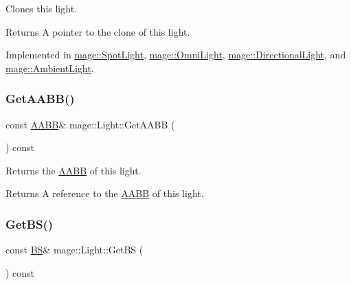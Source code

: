 Clones this light.

\begin{DoxyReturn}{Returns}
A pointer to the clone of this light. 
\end{DoxyReturn}


Implemented in \hyperlink{classmage_1_1_spot_light_a060044ae1de97143878ad26524f03709}{mage\+::\+Spot\+Light}, \hyperlink{classmage_1_1_omni_light_a1212457828cdd96cc7170767b7bd1223}{mage\+::\+Omni\+Light}, \hyperlink{classmage_1_1_directional_light_a122d3dcd7633a85ef8a85e7d768da36d}{mage\+::\+Directional\+Light}, and \hyperlink{classmage_1_1_ambient_light_a7223a4770653c20e662810b0956c6e51}{mage\+::\+Ambient\+Light}.

\hypertarget{classmage_1_1_light_a1ce1d4a97857b182e629e0e546beb280}{}\label{classmage_1_1_light_a1ce1d4a97857b182e629e0e546beb280} 
\subsubsection{\texorpdfstring{Get\+A\+A\+B\+B()}{GetAABB()}}
{\footnotesize\ttfamily const \hyperlink{structmage_1_1_a_a_b_b}{A\+A\+BB}\& mage\+::\+Light\+::\+Get\+A\+A\+BB (\begin{DoxyParamCaption}{ }\end{DoxyParamCaption}) const\hspace{0.3cm}{\ttfamily [noexcept]}}

Returns the \hyperlink{structmage_1_1_a_a_b_b}{A\+A\+BB} of this light.

\begin{DoxyReturn}{Returns}
A reference to the \hyperlink{structmage_1_1_a_a_b_b}{A\+A\+BB} of this light. 
\end{DoxyReturn}
\hypertarget{classmage_1_1_light_ab2365a76f8f3a2ae2c97263ea556a993}{}\label{classmage_1_1_light_ab2365a76f8f3a2ae2c97263ea556a993} 
\subsubsection{\texorpdfstring{Get\+B\+S()}{GetBS()}}
{\footnotesize\ttfamily const \hyperlink{structmage_1_1_b_s}{BS}\& mage\+::\+Light\+::\+Get\+BS (\begin{DoxyParamCaption}{ }\end{DoxyParamCaption}) const\hspace{0.3cm}{\ttfamily [noexcept]}}

